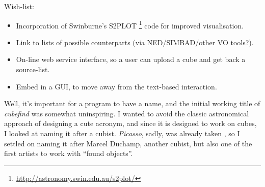 Wish-list:
\begin{itemize}
\item Incorporation of Swinburne's S2PLOT
\footnote{\href{http://astronomy.swin.edu.au/s2plot/}
{http://astronomy.swin.edu.au/s2plot/}} code for improved
visualisation. 
\item Link to lists of possible counterparts (\eg via NED/SIMBAD/other
  VO tools?). 

\item On-line web service interface, so a user can upload a cube and
  get back a source-list.

\item Embed \duchamp in a GUI, to move away from the text-based
  interaction.
\end{itemize}


Well, it's important for a program to have a name, and the initial
working title of \emph{cubefind} was somewhat uninspiring. I wanted to
avoid the classic astronomical approach of designing a cute acronym,
and since it is designed to work on cubes, I looked at naming it after
a cubist. \emph{Picasso}, sadly, was already taken \citep{minchin99},
so I settled on naming it after Marcel Duchamp, another cubist, but
also one of the first artists to work with ``found objects''.

